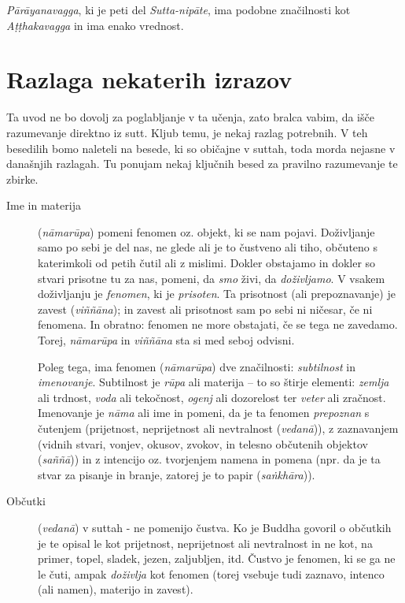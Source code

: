 \emph{Pārāyanavagga}, ki je peti del \emph{Sutta-nipāte}, ima podobne
značilnosti kot \emph{Aṭṭhakavagga} in ima enako vrednost.

\chapter{Razlaga nekaterih izrazov}

Ta uvod ne bo dovolj za poglabljanje v ta učenja, zato bralca vabim, da
išče razumevanje direktno iz sutt. Kljub temu, je nekaj razlag
potrebnih. V teh besedilih bomo naleteli na besede, ki so običajne v
suttah, toda morda nejasne v današnjih razlagah. Tu ponujam nekaj
ključnih besed za pravilno razumevanje te zbirke.

\begin{description}

\item[Ime in materija] (\emph{nāmarūpa}) pomeni fenomen oz. objekt,
ki se nam pojavi. Doživljanje samo po sebi je del nas, ne glede ali je
to čustveno ali tiho, občuteno s katerimkoli od petih čutil ali z
mislimi. Dokler obstajamo in dokler so stvari prisotne tu za nas,
pomeni, da \emph{smo} živi, da \emph{doživljamo}. V vsakem doživljanju
je \emph{fenomen}, ki je \emph{prisoten}. Ta prisotnost (ali
prepoznavanje) je zavest (\emph{viññāna}); in zavest ali prisotnost sam
po sebi ni ničesar, če ni fenomena. In obratno: fenomen ne more
obstajati, če se tega ne zavedamo. Torej, \emph{nāmarūpa} in
\emph{viññāna} sta si med seboj odvisni.

Poleg tega, ima fenomen (\emph{nāmarūpa}) dve značilnosti:
\emph{subtilnost} in \emph{imenovanje}. Subtilnost je \emph{rūpa} ali
materija -- to so štirje elementi: \emph{zemlja} ali trdnost,
\emph{voda} ali tekočnost, \emph{ogenj} ali dozorelost ter \emph{veter}
ali zračnost. Imenovanje je \emph{nāma} ali ime in pomeni, da je ta
fenomen \emph{prepoznan} s čutenjem (prijetnost, neprijetnost ali
nevtralnost (\emph{vedanā})), z zaznavanjem (vidnih stvari, vonjev,
okusov, zvokov, in telesno občutenih objektov (\emph{saññā})) in z
intencijo oz. tvorjenjem namena in pomena (npr. da je ta stvar za
pisanje in branje, zatorej je to papir (\emph{saṅkhāra})).

\item[Občutki] (\emph{vedanā}) v suttah - ne pomenijo čustva. Ko je
Buddha govoril o občutkih je te opisal le kot prijetnost, neprijetnost
ali nevtralnost in ne kot, na primer, topel, sladek, jezen, zaljubljen,
itd. Čustvo je fenomen, ki se ga ne le čuti, ampak \emph{doživlja} kot
fenomen (torej vsebuje tudi zaznavo, intenco (ali namen), materijo in
zavest).


\end{description}
